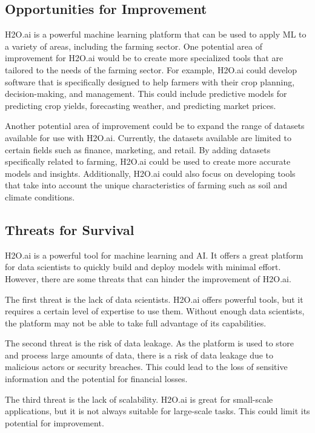 \documentclass[12pt,a4paper]{report}
\begin{document}
\subsection{Opportunities for Improvement}

H2O.ai is a powerful machine learning platform that can be used to apply ML to a variety of areas, including the farming sector. One potential area of improvement for H2O.ai would be to create more specialized tools that are tailored to the needs of the farming sector. For example, H2O.ai could develop software that is specifically designed to help farmers with their crop planning, decision-making, and management. This could include predictive models for predicting crop yields, forecasting weather, and predicting market prices. 

Another potential area of improvement could be to expand the range of datasets available for use with H2O.ai. Currently, the datasets available are limited to certain fields such as finance, marketing, and retail. By adding datasets specifically related to farming, H2O.ai could be used to create more accurate models and insights. Additionally, H2O.ai could also focus on developing tools that take into account the unique characteristics of farming such as soil and climate conditions.

\subsection{Threats for Survival}

H2O.ai is a powerful tool for machine learning and \ac{AI}. It offers a great platform for data scientists to quickly build and deploy models with minimal effort. However, there are some threats that can hinder the improvement of H2O.ai. 

The first threat is the lack of data scientists. H2O.ai offers powerful tools, but it requires a certain level of expertise to use them. Without enough data scientists, the platform may not be able to take full advantage of its capabilities.

The second threat is the risk of data leakage. As the platform is used to store and process large amounts of data, there is a risk of data leakage due to malicious actors or security breaches. This could lead to the loss of sensitive information and the potential for financial losses.

The third threat is the lack of scalability. H2O.ai is great for small-scale applications, but it is not always suitable for large-scale tasks. This could limit its potential for improvement.
\end{document}

